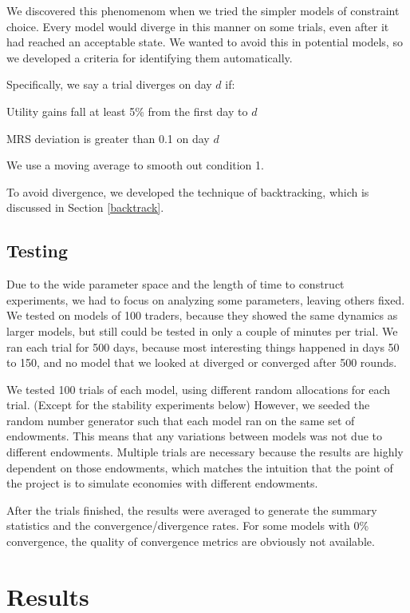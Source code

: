 \documentclass[12pt,a4paper,titlepage]{article}
\begin{document}
We discovered this phenomenom when we tried the simpler models of constraint choice.
Every model would diverge in this manner on some trials, even after it had reached an acceptable state.
We wanted to avoid this in potential models, so we developed a criteria for identifying them automatically.

Specifically, we say a trial diverges on day $d$ if:
\begin{description}[align=right,labelwidth=2cm,font=\normalfont]
\item[1.] Utility gains fall at least 5\% from the first day to $d$ 
\item[AND 2.] MRS deviation is greater than 0.1 on day $d$
\end{description}
We use a moving average to smooth out condition 1.
    
To avoid divergence, we developed the technique of backtracking, which is discussed in Section \ref{backtrack}.

\subsection{Testing}
Due to the wide parameter space and the length of time to construct experiments, we had to focus on analyzing some parameters, leaving others fixed.
We tested on models of 100 traders, because they showed the same dynamics as larger models, but still could be tested in only a couple of minutes per trial.
We ran each trial for 500 days, because most interesting things happened in days 50 to 150, and no model that we looked at diverged or converged after 500 rounds.

We tested 100 trials of each model, using different random allocations for each trial.
(Except for the stability experiments below)
However, we seeded the random number generator such that each model ran on the same set of endowments.
This means that any variations between models was not due to different endowments.
Multiple trials are necessary because the results are highly dependent on those endowments, which matches the intuition that the point of the project is to simulate economies with different endowments.
    
After the trials finished, the results were averaged to generate the summary statistics and the convergence/divergence rates.
For some models with 0\% convergence, the quality of convergence metrics are obviously not available.

\section{Results}\label{results}
\end{document}
